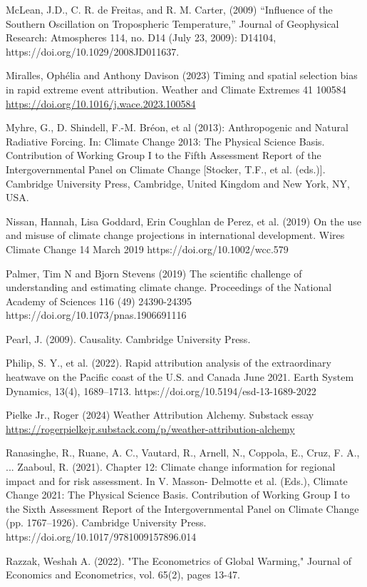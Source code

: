 \documentclass[12pt,paper=a4,DIV=12,parskip=never,chapterprefix=false,headings=standardclasses]{scrreprt}
\begin{document}
McLean, J.D., C. R. de Freitas, and R. M. Carter, (2009) “Influence of the Southern Oscillation on
Tropospheric Temperature,” Journal of Geophysical Research: Atmospheres 114, no. D14 (July 23,
2009): D14104, https://doi.org/10.1029/2008JD011637.

Miralles, Ophélia and Anthony Davison (2023) Timing and spatial selection bias in rapid extreme event
attribution. Weather and Climate Extremes 41 100584 \url{https://doi.org/10.1016/j.wace.2023.100584}

Myhre, G., D. Shindell, F.-M. Bréon, et al (2013): Anthropogenic and Natural Radiative Forcing. In:
Climate Change 2013: The Physical Science Basis. Contribution of Working Group I to the Fifth
Assessment Report of the Intergovernmental Panel on Climate Change [Stocker, T.F., et al. (eds.)].
Cambridge University Press, Cambridge, United Kingdom and New York, NY, USA.

Nissan, Hannah, Lisa Goddard, Erin Coughlan de Perez, et al. (2019) On the use and misuse of climate
change projections in international development. Wires Climate Change 14 March 2019
https://doi.org/10.1002/wcc.579

Palmer, Tim N and Bjorn Stevens (2019) The scientific challenge of understanding and estimating
climate change. Proceedings of the National Academy of Sciences 116 (49) 24390-24395
https://doi.org/10.1073/pnas.1906691116

Pearl, J. (2009). Causality. Cambridge University Press.

Philip, S. Y., et al. (2022). Rapid attribution analysis of the extraordinary heatwave on the Pacific coast of
the U.S. and Canada June 2021. Earth System Dynamics, 13(4), 1689–1713.
https://doi.org/10.5194/esd-13-1689-2022

Pielke Jr., Roger (2024) Weather Attribution Alchemy. Substack essay
\url{https://rogerpielkejr.substack.com/p/weather-attribution-alchemy}

Ranasinghe, R., Ruane, A. C., Vautard, R., Arnell, N., Coppola, E., Cruz, F. A., ... Zaaboul, R. (2021).
Chapter 12: Climate change information for regional impact and for risk assessment. In V. Masson-
Delmotte et al. (Eds.), Climate Change 2021: The Physical Science Basis. Contribution of Working
Group I to the Sixth Assessment Report of the Intergovernmental Panel on Climate Change (pp.
1767–1926). Cambridge University Press. https://doi.org/10.1017/9781009157896.014

Razzak, Weshah A. (2022). "The Econometrics of Global Warming," Journal of Economics and
Econometrics, vol. 65(2), pages 13-47.
\end{document}
